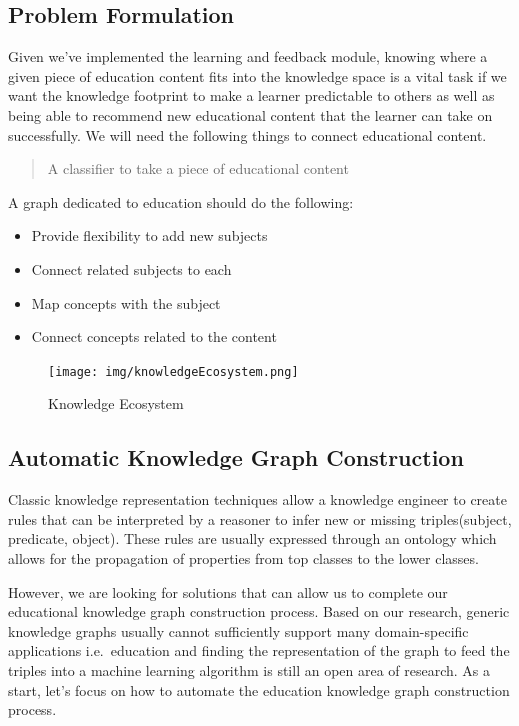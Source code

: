 \documentclass{acm_proc_article-sp}
\begin{document}
\subsection{Problem Formulation}\label{problem-formulation-2}

Given we've implemented the learning and feedback module, knowing where
a given piece of education content fits into the knowledge space is a
vital task if we want the knowledge footprint to make a learner
predictable to others as well as being able to recommend new educational
content that the learner can take on successfully. We will need the
following things to connect educational content.

\begin{quote}
A classifier to take a piece of educational content
\end{quote}

A graph dedicated to education should do the following:

\begin{itemize}
\item
  Provide flexibility to add new subjects
\item
  Connect related subjects to each
\item
  Map concepts with the subject
\item
  Connect concepts related to the content
\end{itemize}

\begin{figure}
\centering
\texttt{[image: img/knowledgeEcosystem.png]}
\caption{Knowledge Ecosystem}
\end{figure}

\subsection{Automatic Knowledge Graph
Construction}\label{automatic-knowledge-graph-construction}

Classic knowledge representation techniques allow a knowledge engineer
to create rules that can be interpreted by a reasoner to infer new or
missing triples(subject, predicate, object). These rules are usually
expressed through an ontology which allows for the propagation of
properties from top classes to the lower classes.

However, we are looking for solutions that can allow us to complete our
educational knowledge graph construction process. Based on our research,
generic knowledge graphs usually cannot sufficiently support many
domain-specific applications i.e.~education and finding the
representation of the graph to feed the triples into a machine learning
algorithm is still an open area of research. As a start, let's focus on
how to automate the education knowledge graph construction process.
\end{document}
